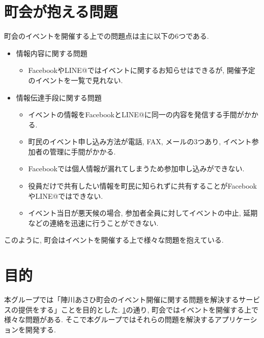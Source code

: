 \section{町会が抱える問題}
\label{problems}
町会のイベントを開催する上での問題点は主に以下の6つである.
\begin{itemize}
    \item 情報内容に関する問題
    \begin{itemize}
        \item FacebookやLINE@ではイベントに関するお知らせはできるが,
              開催予定のイベントを一覧で見れない.
    \end{itemize}
    \item 情報伝達手段に関する問題
    \begin{itemize}
        \item イベントの情報をFacebookとLINE@に同一の内容を発信する手間がかかる.
        \item 町民のイベント申し込み方法が電話, FAX, メールの3つあり, イベント参加者の管理に手間がかかる.
        \item Facebookでは個人情報が漏れてしまうため参加申し込みができない.
        \item 役員だけで共有したい情報を町民に知られずに共有することがFacebookやLINE@ではできない.
    \end{itemize}
    \begin{itemize}
        \item イベント当日が悪天候の場合, 参加者全員に対してイベントの中止,
              延期などの連絡を迅速に行うことができない.
    \end{itemize}
\end{itemize}
このように, 町会はイベントを開催する上で様々な問題を抱えている.

\section{目的}
本グループでは「陣川あさひ町会のイベント開催に関する問題を解決するサービスの提供をする」ことを目的とした.
\ref{problems}の通り, 町会ではイベントを開催する上で様々な問題がある.
そこで本グループではそれらの問題を解決するアプリケーションを開発する.
